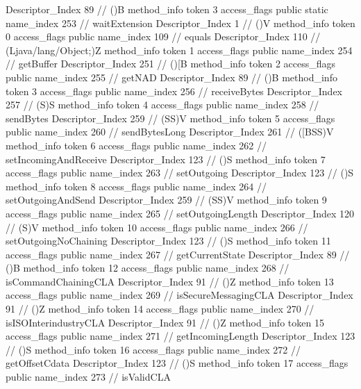 {{{{{					Descriptor_Index	89		// ()B
				}
				method_info {
					token	3
					access_flags	public static
					name_index	253		// waitExtension
					Descriptor_Index	1		// ()V
				}
				method_info {
					token	0
					access_flags	public
					name_index	109		// equals
					Descriptor_Index	110		// (Ljava/lang/Object;)Z
				}
				method_info {
					token	1
					access_flags	public
					name_index	254		// getBuffer
					Descriptor_Index	251		// ()[B
				}
				method_info {
					token	2
					access_flags	public
					name_index	255		// getNAD
					Descriptor_Index	89		// ()B
				}
				method_info {
					token	3
					access_flags	public
					name_index	256		// receiveBytes
					Descriptor_Index	257		// (S)S
				}
				method_info {
					token	4
					access_flags	public
					name_index	258		// sendBytes
					Descriptor_Index	259		// (SS)V
				}
				method_info {
					token	5
					access_flags	public
					name_index	260		// sendBytesLong
					Descriptor_Index	261		// ([BSS)V
				}
				method_info {
					token	6
					access_flags	public
					name_index	262		// setIncomingAndReceive
					Descriptor_Index	123		// ()S
				}
				method_info {
					token	7
					access_flags	public
					name_index	263		// setOutgoing
					Descriptor_Index	123		// ()S
				}
				method_info {
					token	8
					access_flags	public
					name_index	264		// setOutgoingAndSend
					Descriptor_Index	259		// (SS)V
				}
				method_info {
					token	9
					access_flags	public
					name_index	265		// setOutgoingLength
					Descriptor_Index	120		// (S)V
				}
				method_info {
					token	10
					access_flags	public
					name_index	266		// setOutgoingNoChaining
					Descriptor_Index	123		// ()S
				}
				method_info {
					token	11
					access_flags	public
					name_index	267		// getCurrentState
					Descriptor_Index	89		// ()B
				}
				method_info {
					token	12
					access_flags	public
					name_index	268		// isCommandChainingCLA
					Descriptor_Index	91		// ()Z
				}
				method_info {
					token	13
					access_flags	public
					name_index	269		// isSecureMessagingCLA
					Descriptor_Index	91		// ()Z
				}
				method_info {
					token	14
					access_flags	public
					name_index	270		// isISOInterindustryCLA
					Descriptor_Index	91		// ()Z
				}
				method_info {
					token	15
					access_flags	public
					name_index	271		// getIncomingLength
					Descriptor_Index	123		// ()S
				}
				method_info {
					token	16
					access_flags	public
					name_index	272		// getOffsetCdata
					Descriptor_Index	123		// ()S
				}
				method_info {
					token	17
					access_flags	public
					name_index	273		// isValidCLA
}}}}}
